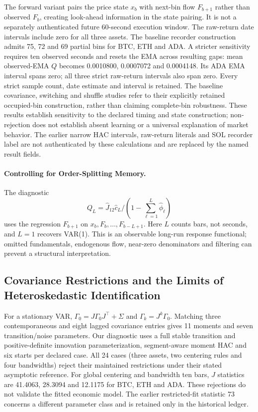 \documentclass[12pt]{article}
\theoremstyle{definition}
\theoremstyle{remark}
\begin{document}
The forward variant pairs the price state $x_b$ with next-bin flow $F_{b+1}$ rather than observed $F_b$, creating look-ahead information in the state pairing. It is not a separately authenticated future 60-second execution window. The raw-return date intervals include zero for all three assets. The baseline recorder construction admits 75, 72 and 69 partial bins for BTC, ETH and ADA. A stricter sensitivity requires ten observed seconds and resets the EMA across resulting gaps: mean observed-EMA $Q$ becomes 0.0010800, 0.0007072 and 0.0004148. Its ADA EMA interval spans zero; all three strict raw-return intervals also span zero. Every strict sample count, date estimate and interval is retained. The baseline covariance, switching and shuffle studies refer to their explicitly retained occupied-bin construction, rather than claiming complete-bin robustness. These results establish sensitivity to the declared timing and state construction; non-rejection does not establish absent learning or a universal explanation of market behavior. The earlier narrow HAC intervals, raw-return literals and SOL recorder label are not authenticated by these calculations and are replaced by the named result fields.

\paragraph{Controlling for Order-Splitting Memory.}
The diagnostic \[Q_L=\hat J_{12}\hat c_L/(1-\sum_{\ell=1}^L\hat\phi_\ell)\] uses the regression $F_{b+1}$ on $x_b,F_b,\ldots,F_{b-L+1}$. Here $L$ counts bars, not seconds, and $L=1$ recovers VAR(1). This is an observable long-run response functional; omitted fundamentals, endogenous flow, near-zero denominators and filtering can prevent a structural interpretation.

\subsection{Covariance Restrictions and the Limits of Heteroskedastic Identification}
For a stationary VAR, $\Gamma_0=J\Gamma_0J^\top+\Sigma$ and $\Gamma_k=J^k\Gamma_0$. Matching three contemporaneous and eight lagged covariance entries gives 11 moments and seven transition/noise parameters. Our diagnostic uses a full stable transition and positive-definite innovation parameterization, segment-aware moment HAC and six starts per declared case. All 24 cases (three assets, two centering rules and four bandwidths) reject their maintained restrictions under their stated asymptotic reference. For global centering and bandwidth ten bars, $J$ statistics are 41.4063, 28.3094 and 12.1175 for BTC, ETH and ADA. These rejections do not validate the fitted economic model. The earlier restricted-fit statistic 73 concerns a different parameter class and is retained only in the historical ledger.
\end{document}
